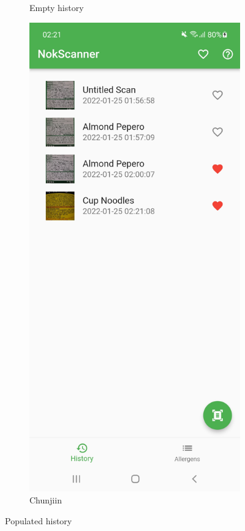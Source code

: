 \begin{figure}[h]
\begin{subfigure}{0.5\textwidth}
        \caption{Empty history}
        \label{fig:history-empty}
    \end{subfigure}
    \begin{subfigure}{0.5\textwidth}
        \centering
        \includegraphics[width=0.9\linewidth]{Figures/Screenshot/history.jpg}
        \caption{Chunjiin}
        \label{fig:history}
    \end{subfigure}
    \caption{Populated history}
    \label{fig:history2}
\end{figure}

